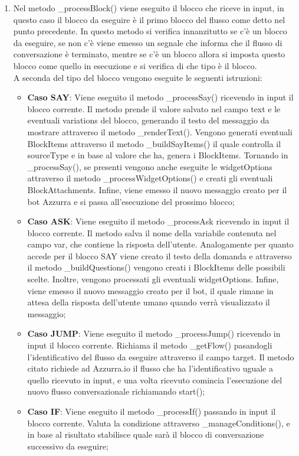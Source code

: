 \begin{enumerate}
	\item Nel metodo \_processBlock() viene eseguito il blocco che riceve in input, in questo caso il blocco da eseguire è il primo blocco del flusso come detto nel punto precedente. In questo metodo si verifica innanzitutto se c'è un blocco da eseguire, se non c'è viene emesso un segnale che informa che il flusso di conversazione è terminato, mentre se c'è un blocco allora si imposta questo blocco come quello in esecuzione e si verifica di che tipo è il blocco.\\
	A seconda del tipo del blocco vengono eseguite le seguenti istruzioni:
	\begin{itemize}
		\item \textbf{Caso SAY}: Viene eseguito il metodo \_processSay() ricevendo in input il blocco corrente. Il metodo prende il valore salvato nel campo text e le eventuali variations del blocco, generando il testo del messaggio da mostrare attraverso il metodo \_renderText(). Vengono generati eventuali BlockItems attraverso il metodo \_buildSayItems() il quale controlla il sourceType e in base al valore che ha, genera i BlockItems. Tornando in \_processSay(), se presenti vengono anche eseguite le widgetOptions attraverso il metodo \_processWidgetOptions() e creati gli eventuali BlockAttachments. Infine, viene emesso il nuovo messaggio creato per il \gls{bot}\ap{[g]} Azzurra e si passa all'esecuzione del prossimo blocco;
		\item \textbf{Caso ASK}: Viene eseguito il metodo \_processAsk ricevendo in input il blocco corrente. Il metodo salva il nome della variabile contenuta nel campo var, che contiene la risposta dell'utente. Analogamente per quanto accede per il blocco SAY viene creato il testo della domanda e attraverso il metodo \_buildQuestions() vengono creati i BlockItems delle possibili scelte. Inoltre, vengono processati gli eventuali widgetOptions. Infine, viene emesso il nuovo messaggio creato per il bot, il quale rimane in attesa della risposta dell'utente umano quando verrà visualizzato il messaggio;
		\item \textbf{Caso JUMP}: Viene eseguito il metodo \_processJump() ricevendo in input il blocco corrente. Richiama il metodo \_getFlow() pasandogli l'identificativo del flusso da eseguire attraverso il campo target. Il metodo citato richiede ad Azzurra.io il flusso che ha l'identificativo uguale a quello ricevuto in input, e una volta ricevuto comincia l'esecuzione del nuovo flusso conversazionale richiamando start();
		\item \textbf{Caso IF}: Viene eseguito il metodo \_processIf() passando in input il blocco corrente. Valuta la condizione attraverso \_manageConditions(), e in base al risultato stabilisce quale sarà il blocco di conversazione successivo da eseguire;

\end{itemize}
\end{enumerate}
